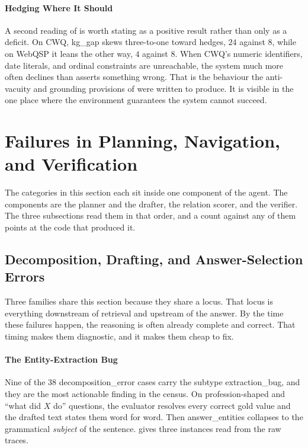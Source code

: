 \paragraph{Hedging Where It Should}

A second reading of  is worth stating as a positive
result rather than only as a deficit. On CWQ, \textsf{kg\_gap}
skews three-to-one toward hedges, $24$ against $8$, while on WebQSP it leans the
other way, $4$ against $8$. When CWQ's numeric identifiers, date literals, and
ordinal constraints are unreachable, the system much more often declines than
asserts something wrong. That is the behaviour the anti-vacuity and grounding
provisions of  were written to produce. It is
visible in the one place where the environment guarantees the system cannot
succeed.

\section{Failures in Planning, Navigation, and
Verification}\label{sec:failure-categories}

The categories in this section each sit inside one component of the agent. The
components are the planner and the drafter, the relation scorer, and the
verifier. The three subsections read them in that order, and a count against any
of them points at the code that produced it.

\subsection{Decomposition, Drafting, and Answer-Selection
Errors}\label{sec:decomposition-errors}

Three families share this section because they share a locus. That locus is
everything downstream of retrieval and upstream of the answer. By the time these
failures happen, the reasoning is often already complete and correct. That
timing makes them diagnostic, and it makes them cheap to fix.

\paragraph{The Entity-Extraction Bug}

Nine of the $38$ \textsf{decomposition\_error} cases carry the subtype
\textsf{extraction\_bug}, and they are the most actionable finding in the
census. On profession-shaped and ``what did $X$ do'' questions, the evaluator
resolves every correct gold value and the drafted text states them word for
word. Then \textsf{answer\_entities} collapses to the grammatical \emph{subject}
of the sentence.  gives three instances read from the raw
traces.

